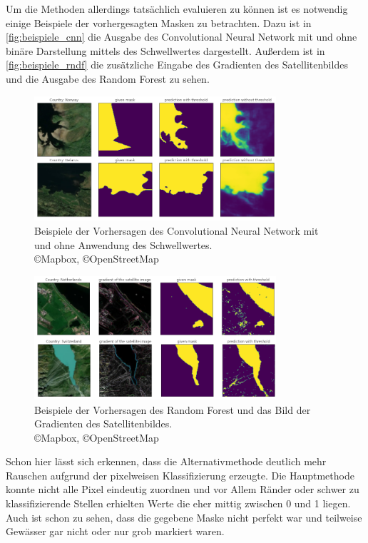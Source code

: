 Um die Methoden allerdings tatsächlich evaluieren zu können ist es notwendig einige Beispiele der vorhergesagten Masken zu betrachten.
Dazu ist in \autoref{fig:beispiele_cnn} die Ausgabe des Convolutional Neural Network mit und ohne binäre Darstellung mittels des Schwellwertes dargestellt.
Außerdem ist in \autoref{fig:beispiele_rndf} die zusätzliche Eingabe des Gradienten des Satellitenbildes und die Ausgabe des Random Forest zu sehen.

\begin{figure}
    \centering
    \includegraphics[width=0.8\textwidth]{images/bsp_cnn.png}
    \caption{Beispiele der Vorhersagen des Convolutional Neural Network mit und ohne Anwendung des Schwellwertes. %
    \\ \copyright Mapbox, \copyright OpenStreetMap}
    \label{fig:beispiele_cnn}
\end{figure}

\begin{figure}
    \centering
    \includegraphics[width=0.8\textwidth]{images/bsp_rndf.png}
    \caption{Beispiele der Vorhersagen des Random Forest und  %
    das Bild der Gradienten des Satellitenbildes. %
    \\ \copyright Mapbox, \copyright OpenStreetMap}
    \label{fig:beispiele_rndf}
\end{figure}

Schon hier lässt sich erkennen, dass die Alternativmethode deutlich mehr Rauschen aufgrund der pixelweisen Klassifizierung erzeugte.
Die Hauptmethode konnte nicht alle Pixel eindeutig zuordnen und vor Allem Ränder oder schwer zu klassifizierende Stellen erhielten Werte die eher mittig zwischen 0 und 1 liegen.
Auch ist schon zu sehen, dass die gegebene Maske nicht perfekt war und teilweise Gewässer gar nicht oder nur grob markiert waren.

